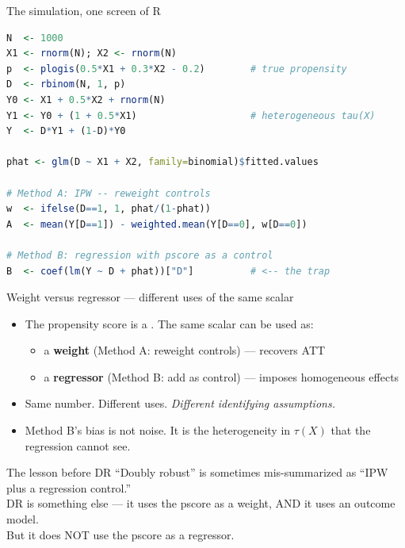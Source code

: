 \documentclass[aspectratio=169,11pt]{beamer}
\begin{document}
\begin{frame}[fragile]{The simulation, one screen of R}
\vspace{0.1em}
\begin{lstlisting}[language=R,basicstyle=\ttfamily\scriptsize]
N  <- 1000
X1 <- rnorm(N); X2 <- rnorm(N)
p  <- plogis(0.5*X1 + 0.3*X2 - 0.2)        # true propensity
D  <- rbinom(N, 1, p)
Y0 <- X1 + 0.5*X2 + rnorm(N)
Y1 <- Y0 + (1 + 0.5*X1)                    # heterogeneous tau(X)
Y  <- D*Y1 + (1-D)*Y0

phat <- glm(D ~ X1 + X2, family=binomial)$fitted.values

# Method A: IPW -- reweight controls
w  <- ifelse(D==1, 1, phat/(1-phat))
A  <- mean(Y[D==1]) - weighted.mean(Y[D==0], w[D==0])

# Method B: regression with pscore as a control
B  <- coef(lm(Y ~ D + phat))["D"]          # <-- the trap
\end{lstlisting}
\end{frame}

\begin{frame}{Weight versus regressor --- different uses of the same scalar}
\vspace{0.4em}
\begin{itemize}
  \item The propensity score is a . The same scalar can be used as:
  \begin{itemize}\small
    \item[--] a \textbf{weight} (Method A: reweight controls) --- recovers ATT
    \item[--] a \textbf{regressor} (Method B: add as control) --- imposes homogeneous effects
  \end{itemize}
  \item Same number. Different uses. \textit{Different identifying assumptions.}
  \item Method B's bias is not noise. It is the heterogeneity in $\tau(X)$ that the regression cannot see.
\end{itemize}
\vspace{0.5em}
\begin{block}{The lesson before DR}
\small
``Doubly robust'' is sometimes mis-summarized as ``IPW plus a regression control.'' \\[0.2em]
 DR is something else --- it uses the pscore as a weight, AND it uses an outcome model. \\
But it does NOT use the pscore as a regressor.
\end{block}
\end{frame}
\end{document}
